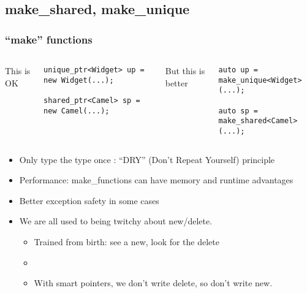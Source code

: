 \subsection{make\_shared, make\_unique}
\begin{frame}[fragile]
\frametitle{``make'' functions}
\begin{columns}[t]
This is OK
{\scriptsize\begin{verbatim}
unique_ptr<Widget> up = new Widget(...);

shared_ptr<Camel> sp = new Camel(...);
\end{verbatim}}
\pause{}
But this is better
{\scriptsize\begin{verbatim}
auto up = make_unique<Widget>(...);

auto sp = make_shared<Camel>(...);
\end{verbatim}}
\end{columns}
\vskip 12pt
\pause{}
\begin{itemize}
\item Only type the type once : ``DRY'' (Don't Repeat Yourself) principle
\vskip 6pt
\item Performance: make\_functions can have memory and runtime advantages
\item Better exception safety in some cases
\vskip 6pt
\item We are all used to being twitchy about new/delete.  
\begin{itemize}
  \item Trained from birth: see a new, look for the delete
  \item {}
  \item With smart pointers, we don't write delete, so don't write new.
  \end{itemize}
\end{itemize}
\pause{}

\end{frame}

